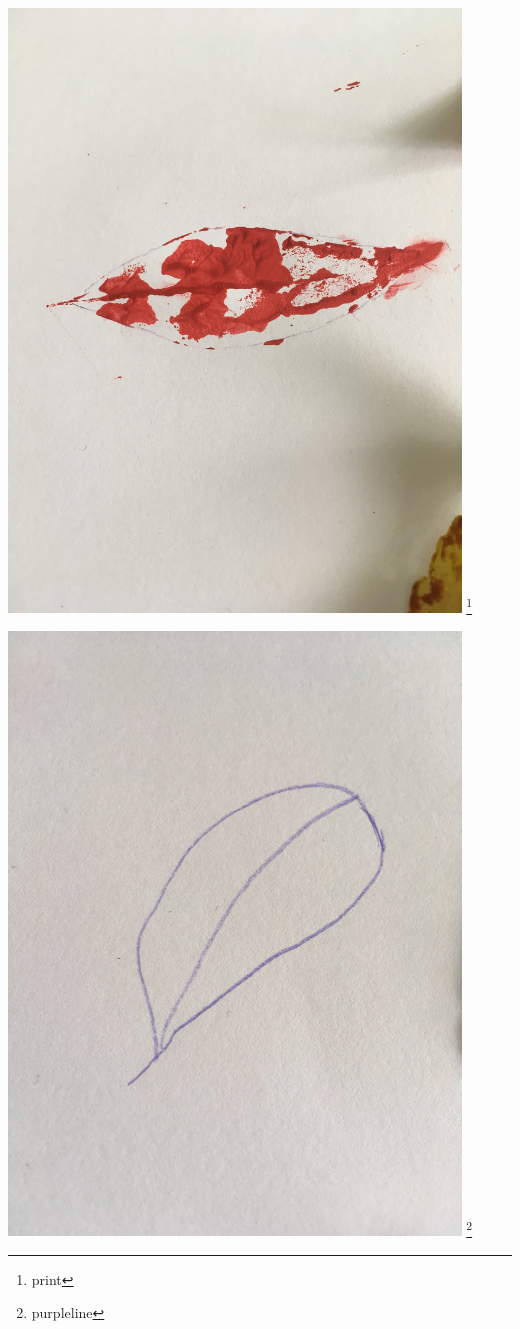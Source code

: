 \documentclass[12pt, a4paper]{article}
\begin{document}
\includegraphics[width=0.9\textwidth,height=\textheight,keepaspectratio]{leaf-print.jpg}
\footnote{print}
\newpage

\includegraphics[width=0.9\textwidth,height=\textheight,keepaspectratio]{leaf-singleline.jpg}
\footnote{purpleline}
\end{document}
